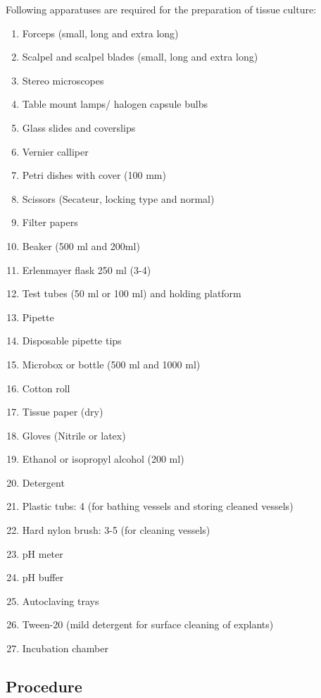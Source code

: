\documentclass[
  man]{apa6}
\providecommand{\tightlist}{%
  \setlength{\itemsep}{0pt}\setlength{\parskip}{0pt}}
\begin{document}
Following apparatuses are required for the preparation of tissue culture:

\begin{enumerate}
\def\labelenumi{\arabic{enumi}.}
\tightlist
\item
  Forceps (small, long and extra long)
\item
  Scalpel and scalpel blades (small, long and extra long)
\item
  Stereo microscopes
\item
  Table mount lamps/ halogen capsule bulbs
\item
  Glass slides and coverslips
\item
  Vernier calliper
\item
  Petri dishes with cover (100 mm)
\item
  Scissors (Secateur, locking type and normal)
\item
  Filter papers
\item
  Beaker (500 ml and 200ml)
\item
  Erlenmayer flask 250 ml (3-4)
\item
  Test tubes (50 ml or 100 ml) and holding platform
\item
  Pipette
\item
  Disposable pipette tips
\item
  Microbox or bottle (500 ml and 1000 ml)
\item
  Cotton roll
\item
  Tissue paper (dry)
\item
  Gloves (Nitrile or latex)
\item
  Ethanol or isopropyl alcohol (200 ml)
\item
  Detergent
\item
  Plastic tubs: 4 (for bathing vessels and storing cleaned vessels)
\item
  Hard nylon brush: 3-5 (for cleaning vessels)
\item
  pH meter
\item
  pH buffer
\item
  Autoclaving trays
\item
  Tween-20 (mild detergent for surface cleaning of explants)
\item
  Incubation chamber
\end{enumerate}

\hypertarget{procedure}{%
\subsection{Procedure}\label{procedure}}
\end{document}
